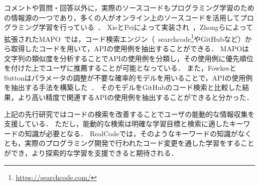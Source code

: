 コメントや質問・回答以外に，実際のソースコードもプログラミング学習のための情報源の一つであり，多くの人がオンライン上のソースコードを活用してプログラミング学習を行っている~\cite{Brandt:2009:TSO:1518701.1518944}．
XieとPeiによって実装され~\cite{MAPO}，Zhongらによって拡張されたMAPO~\cite{extended_MAPO}では，コード検索エンジン（~searchcode\footnote{\url{https://searchcode.com/}}やGitHubなど）から取得したコードを用いて，APIの使用例を抽出することができる．
MAPOは文字列の類似度を分析することでAPIの使用例を分類し，その使用例に優先順位を付けた上でユーザに推薦することが可能となっている．
また，FowkesとSuttonはパラメータの調整が不要な確率的モデルを用いることで，APIの使用例を抽出する手法を構築した~\cite{GitHubAPIMining}．
そのモデルをGitHubのコード検索と比較した結果，より高い精度で関連するAPIの使用例を抽出することができると分かった．



上記の先行研究ではコードの検索を改善することでユーザの能動的な情報収集を支援している．
ただし，能動的な検索は明確な学習目標と検索に適したキーワードの知識が必要となる．
RealCodeでは，そのようなキーワードの知識がなくとも，実際のプログラミング開発で行われたコード変更を通した学習をすることができ，より探索的な学習を支援できると期待される．





